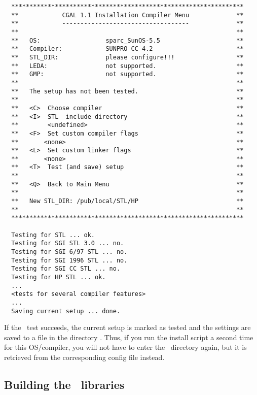 {\scriptsize
\begin{verbatim}
  ****************************************************************
  **            CGAL 1.1 Installation Compiler Menu             **
  **            -----------------------------------             **
  **                                                            **
  **   OS:                  sparc_SunOS-5.5                     **
  **   Compiler:            SUNPRO CC 4.2                       **
  **   STL_DIR:             please configure!!!                 **
  **   LEDA:                not supported.                      **
  **   GMP:                 not supported.                      **
  **                                                            **
  **   The setup has not been tested.                           **
  **                                                            **
  **   <C>  Choose compiler                                     **
  **   <I>  STL  include directory                              **
  **        <undefined>                                         **
  **   <F>  Set custom compiler flags                           **
  **       <none>                                               **
  **   <L>  Set custom linker flags                             **
  **       <none>                                               **
  **   <T>  Test (and save) setup                               **
  **                                                            **
  **   <Q>  Back to Main Menu                                   **
  **                                                            **
  **   New STL_DIR: /pub/local/STL/HP                           **
  **                                                            **
  ****************************************************************

  Testing for STL ... ok.
  Testing for SGI STL 3.0 ... no.
  Testing for SGI 6/97 STL ... no.
  Testing for SGI 1996 STL ... no.
  Testing for SGI CC STL ... no.
  Testing for HP STL ... ok.
  ...
  <tests for several compiler features>
  ...
  Saving current setup ... done.
\end{verbatim}}

If the \stl\ test succeeds, the current setup is marked as tested and
the settings are saved to a file in the directory \cgalinstconfdir.
Thus, if you run the install script a second time for this
OS/compiler, you will not have to enter the \stl\ directory again, but
it is retrieved from the corresponding config file instead.

\subsection{Building the \cgal\ libraries}\label{sec:build-the-libs}

